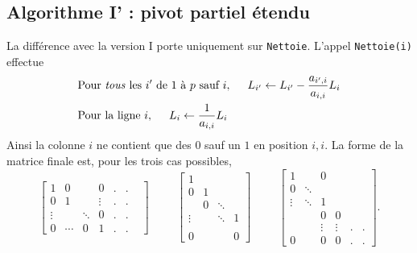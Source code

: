 \subsection{Algorithme I' : pivot partiel étendu}
 La différence avec la version I porte uniquement sur \verb|Nettoie|. L'appel \verb|Nettoie(i)| effectue
\[
\begin{aligned}
  &\text{Pour \emph{tous} les $i'$ de $1$ à $p$ sauf $i$}, \hspace{0.5cm} L_{i'}\leftarrow L_{i'}-\frac{a_{i',i}}{a_{i,i}}L_i \\
  &\text{Pour la ligne $i$}, \hspace{0.5cm} L_{i}\leftarrow \frac{1}{a_{i,i}}L_i
\end{aligned}
\]
Ainsi la colonne $i$ ne contient que des $0$ sauf un $1$ en position $i,i$.\newline
La forme de la matrice finale est, pour les trois cas possibles,
\[
 \begin{bmatrix}
1      &   0   &        & 0      & . & . \\
0      & 1     &        & \vdots & . & . \\
\vdots &       & \ddots & 0 & .  & . & \\
0      &\cdots &    0   & 1 & .  & . &
 \end{bmatrix}
\hspace{1cm} 
 \begin{bmatrix}
1 &       &       &  \\
 0    &1 &       &  \\
      & 0     &\ddots &  \\
\vdots&       &\ddots & 1 \\
      &       &       &  \\
 0    &       &       & 0
 \end{bmatrix}
\hspace{1cm}
\begin{bmatrix}
 1     &        &0      &       &  &  \\
 0     & \ddots &       &       &  &  \\
\vdots & \ddots &1      &       &  &  \\
       &        &0      & 0     &  &  \\
       &        &\vdots &\vdots & . & . \\
 0     &        &   0   &   0   & . &. 
\end{bmatrix}.
\]

